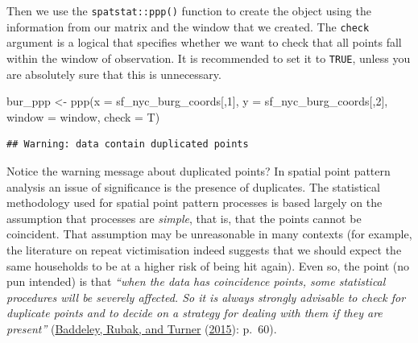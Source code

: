 \documentclass[
  krantz2]{krantz}
\makeatletter
\newenvironment{Shaded}{\begin{snugshade}}{\end{snugshade}}
\newcommand{\AttributeTok}[1]{\textcolor[rgb]{0.61,0.61,0.61}{#1}}
\newcommand{\CommentTok}[1]{\textcolor[rgb]{0.37,0.37,0.37}{\textit{#1}}}
\newcommand{\DecValTok}[1]{\textcolor[rgb]{0.06,0.06,0.06}{#1}}
\newcommand{\FunctionTok}[1]{\textcolor[rgb]{0,0,0}{#1}}
\newcommand{\NormalTok}[1]{#1}
\newcommand{\OtherTok}[1]{\textcolor[rgb]{0.37,0.37,0.37}{#1}}
\newcommand{\SpecialCharTok}[1]{\textcolor[rgb]{0,0,0}{#1}}
\newenvironment{kframe}{%
\medskip{}
\setlength{\fboxsep}{.8em}
 \def\at@end@of@kframe{}%
 \ifinner\ifhmode%
  \def\at@end@of@kframe{\end{minipage}}%
  \begin{minipage}{\columnwidth}%
 \fi\fi%
 \def\FrameCommand##1{\hskip\@totalleftmargin \hskip-\fboxsep
 \colorbox{shadecolor}{##1}\hskip-\fboxsep
     \hskip-\linewidth \hskip-\@totalleftmargin \hskip\columnwidth}%
 \MakeFramed {\advance\hsize-\width
   \@totalleftmargin\z@ \linewidth\hsize
   \@setminipage}}%
 {\par\unskip\endMakeFramed%
 \at@end@of@kframe}
\renewenvironment{Shaded}{\begin{kframe}}{\end{kframe}}
\makeatother
\begin{document}
\begin{Shaded}
\end{Shaded}

Then we use the \texttt{spatstat::ppp()} function to create the object using the information from our matrix and the window that we created. The \texttt{check} argument is a logical that specifies whether we want to check that all points fall within the window of observation. It is recommended to set it to \texttt{TRUE}, unless you are absolutely sure that this is unnecessary.

\begin{Shaded}
\begin{Highlighting}[]
\NormalTok{bur\_ppp }\OtherTok{\textless{}{-}} \FunctionTok{ppp}\NormalTok{(}\AttributeTok{x =}\NormalTok{ sf\_nyc\_burg\_coords[,}\DecValTok{1}\NormalTok{], }\AttributeTok{y =}\NormalTok{ sf\_nyc\_burg\_coords[,}\DecValTok{2}\NormalTok{],}
                   \AttributeTok{window =}\NormalTok{ window, }\AttributeTok{check =}\NormalTok{ T)}
\end{Highlighting}
\end{Shaded}

\begin{verbatim}
## Warning: data contain duplicated points
\end{verbatim}

Notice the warning message about duplicated points? In spatial point pattern analysis an issue of significance is the presence of duplicates. The statistical methodology used for spatial point pattern processes is based largely on the assumption that processes are \emph{simple}, that is, that the points cannot be coincident. That assumption may be unreasonable in many contexts (for example, the literature on repeat victimisation indeed suggests that we should expect the same households to be at a higher risk of being hit again). Even so, the point (no pun intended) is that \emph{``when the data has coincidence points, some statistical procedures will be severely affected. So it is always strongly advisable to check for duplicate points and to decide on a strategy for dealing with them if they are present''} (\protect\hyperlink{ref-Baddeley_2016}{Baddeley, Rubak, and Turner} (\protect\hyperlink{ref-Baddeley_2016}{2015}): p.~60).
\end{document}
